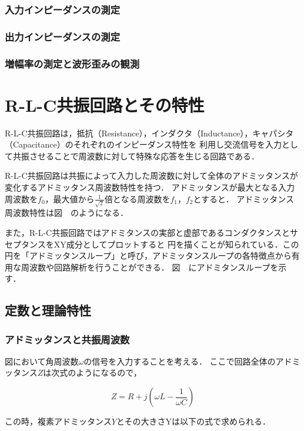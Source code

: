 \documentclass[dvipdfmx,titlepage,a4j]{jsarticle}  %
\numberwithin{equation}{section}
\begin{document}
\subsubsection{入力インピーダンスの測定}

\subsubsection{出力インピーダンスの測定}

\subsubsection{増幅率の測定と波形歪みの観測}

\section{R-L-C共振回路とその特性}
R-L-C共振回路は，抵抗（Resistance），インダクタ（Inductance），キャパシタ（Capacitance）のそれぞれのインピーダンス特性を
利用し交流信号を入力として共振させることで周波数に対して特殊な応答を生じる回路である．

R-L-C共振回路は共振によって入力した周波数に対して全体のアドミッタンスが変化するアドミッタンス周波数特性を持つ．
アドミッタンスが最大となる入力周波数を$f_0$，最大値から$\frac{1}{\sqrt{2}}$倍となる周波数を$f_1$，$f_2$とすると．
アドミッタンス周波数特性は図　のようになる．

また，R-L-C共振回路ではアドミタンスの実部と虚部であるコンダクタンスとサセプタンスをXY成分としてプロットすると
円を描くことが知られている．この円を「アドミッタンスループ」と呼び，アドミッタンスループの各特徴点から有用な周波数や回路解析を行うことができる．
図　にアドミタンスループを示す．

\subsection{定数と理論特性}

\subsubsection{アドミッタンスと共振周波数}
図において角周波数$\omega$の信号を入力することを考える．
ここで回路全体のアドミッタンス$Z$は次式のようになるので，

\begin{equation}
  Z = R + j(\omega L - \frac{1}{\omega C})
\end{equation}

この時，複素アドミッタンス$\dot{Y}$とその大きさYは以下の式で求められる．
\end{document}
